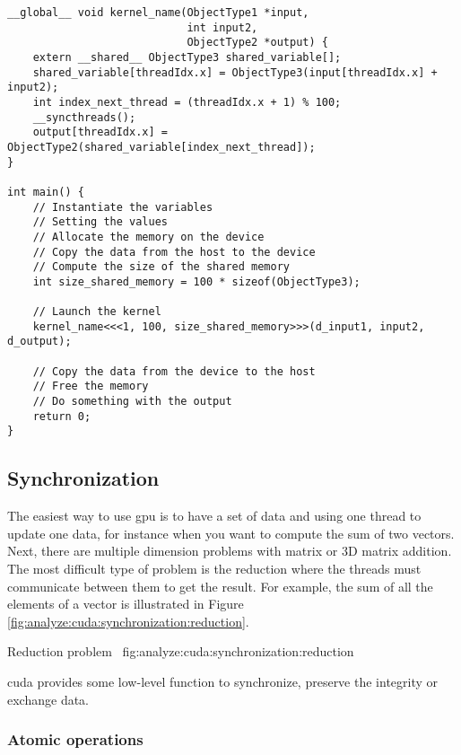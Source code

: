 \begin{code}
    \label{code:analyze:cuda:memory:shared:dynamic}
    \begin{verbatim}
__global__ void kernel_name(ObjectType1 *input,
                            int input2,
                            ObjectType2 *output) {
    extern __shared__ ObjectType3 shared_variable[];
    shared_variable[threadIdx.x] = ObjectType3(input[threadIdx.x] + input2);
    int index_next_thread = (threadIdx.x + 1) % 100;
    __syncthreads();
    output[threadIdx.x] = ObjectType2(shared_variable[index_next_thread]);
}

int main() {
    // Instantiate the variables
    // Setting the values
    // Allocate the memory on the device
    // Copy the data from the host to the device
    // Compute the size of the shared memory
    int size_shared_memory = 100 * sizeof(ObjectType3);

    // Launch the kernel
    kernel_name<<<1, 100, size_shared_memory>>>(d_input1, input2, d_output);

    // Copy the data from the device to the host
    // Free the memory
    // Do something with the output
    return 0;
}
    \end{verbatim}
\end{code}


\subsection{Synchronization}
\label{ch:analyze:cuda:synchronization}

The easiest way to use \acrshort{gpu} is to have a set of data and using one
thread to update one data, for instance when you want to compute the sum of two
vectors.
Next, there are multiple dimension problems with matrix or 3D matrix addition.
The most difficult type of problem is the reduction where the threads must
communicate between them to get the result. For example, the sum of all the
elements of a vector is illustrated in Figure \ref{fig:analyze:cuda:synchronization:reduction}.

{Reduction problem~\cite{cuda-training}}
{fig:analyze:cuda:synchronization:reduction}

\acrshort{cuda} provides some low-level function to synchronize, preserve the
integrity or exchange data.

\subsubsection{Atomic operations}
\label{ch:analyze:cuda:synchronization:atomic}


